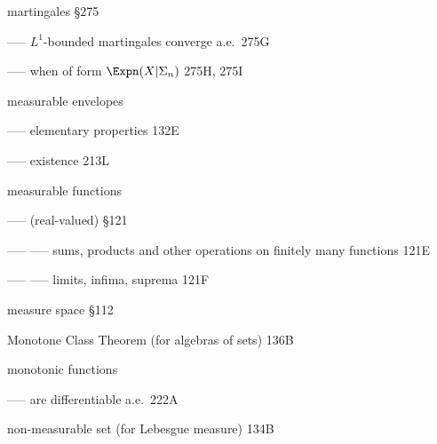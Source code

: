martingales \S275

----- $L^1$-bounded martingales converge a.e.\ 275G


----- when of form $\Expn(X|\Sigma_n)$ 275H, 275I





measurable envelopes

----- elementary properties 132E

----- existence 213L


measurable functions

----- (real-valued) \S121

----- ----- sums, products and other operations
on finitely many functions 121E

----- ----- limits, infima, suprema 121F



























measure space \S112













Monotone Class Theorem (for algebras of sets) 136B

monotonic functions

----- are differentiable a.e.\ 222A

\indexmedskip















non-measurable set (for Lebesgue measure) 134B

